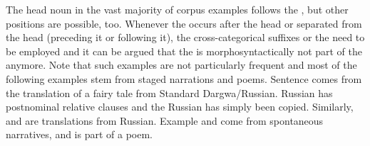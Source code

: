 The head noun in the vast majority of corpus examples follows the , but other positions are possible, too. Whenever the  occurs after the head or separated from the head (preceding it or following it), the cross-categorical suffixes or the  need to be employed and it can be argued that the  is morphosyntactically not part of the  anymore. Note that such examples are not particularly frequent and most of the following examples stem from staged narrations and poems. Sentence  comes from the translation of a fairy tale from Standard Dargwa\slash Russian.  Russian has postnominal relative clauses and the Russian  has simply been copied. Similarly,  and  are translations from Russian. Example  and  come from spontaneous narratives, and  is part of a poem.\pagebreak

